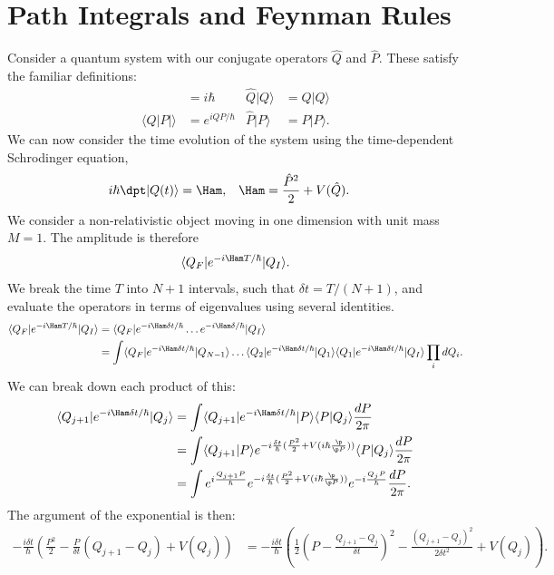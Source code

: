 \documentclass[relqm.tex]{subfiles}
\begin{document}
\chapter{Path Integrals and Feynman Rules}
Consider a quantum system with our conjugate operators $\hat{Q}$ and $\hat{P}$. 
These satisfy the familiar definitions:
\begin{align}
    [\hat{Q},\hat{P}] &= i\hbar & \hat{Q}|Q\rangle &= Q|Q\rangle \\
    \langle Q|P|\rangle &= e^{iQP/\hbar} & \hat{P}|P\rangle &= P|P\rangle.
\end{align}
We can now consider the time evolution of the system using the time-dependent Schrodinger equation,
\begin{align}
    i\hbar\dpt|Q(t)\rangle &= \Ham, & \Ham &= \frac{\hat{P}^2}{2} + V(\hat{Q}).
\end{align}
We consider a non-relativistic object moving in one dimension with unit mass $M=1$.
The amplitude is therefore
\begin{align}
    \langle Q_F|e^{-i\Ham T/\hbar}|Q_I\rangle.
\end{align}
We break the time $T$ into $N+1$ intervals, such that $\delta t = T/(N+1)$, and evaluate the operators in terms of eigenvalues using several identities. 
\begin{align}
    \langle Q_F|e^{-i\Ham T/\hbar}|Q_I\rangle &= \langle Q_F|e^{-i\Ham \delta t/\hbar}\dots e^{-i\Ham \delta/\hbar}|Q_I\rangle \\
                                              &= \int \langle Q_F|e^{-i\Ham \delta t/\hbar}|Q_{N-1}\rangle\dots\langle Q_2|e^{-i\Ham\delta t/\hbar}|Q_1\rangle\langle Q_1|e^{-i\Ham\delta t/\hbar}|Q_I\rangle\prod_i dQ_i.
\end{align}
We can break down each product of this:
\begin{align}
    \langle Q_{j+1}|e^{-i\Ham\delta t/\hbar}|Q_j\rangle &= \int \langle Q_{j+1}|e^{-i\Ham\delta t/\hbar}|P\rangle\langle P|Q_j\rangle\frac{dP}{2\pi} \\
                                                        &= \int \langle Q_{j+1}|P\rangle e^{-i\frac{\delta t}{\hbar}(\frac{P^2}{2}+V(i\hbar\frac{\p}{\p P}))}\langle P|Q_j\rangle\frac{dP}{2\pi} \\
    &= \int e^{i\frac{Q_{j+1}P}{\hbar}}e^{-i\frac{\delta t}{\hbar}(\frac{P^2}{2}+V(i\hbar\frac{\p}{\p P}))}e^{-i\frac{Q_jP}{\hbar}}\frac{dP}{2\pi}.
\end{align}
The argument of the exponential is then:
\begin{align}
    -\frac{i\delta t}{\hbar}\left(\frac{P^2}{2}-\frac{P}{\delta t}(Q_{j+1}-Q_j)+V(Q_j)\right) &= -\frac{i\delta t}{\hbar}\left(\frac12\left(P - \frac{Q_{j+1}-Q_j}{\delta t}\right)^2 - \frac{(Q_{j+1}-Q_j)^2}{2\delta t^2} + V(Q_j)\right).
\end{align}
\end{document}
